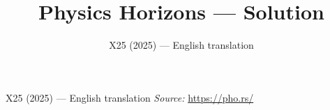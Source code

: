 \documentclass[11pt,a4paper]{article}
\title{\textbf{Physics Horizons --- Solution}}
\author{\normalsize X25 (2025) — English translation}
\date{}
\begin{document}
\maketitle
X25 (2025) — English translation
\vspace{1em}
\noindent\textit{Source:} \url{https://pho.rs/}
\end{document}
